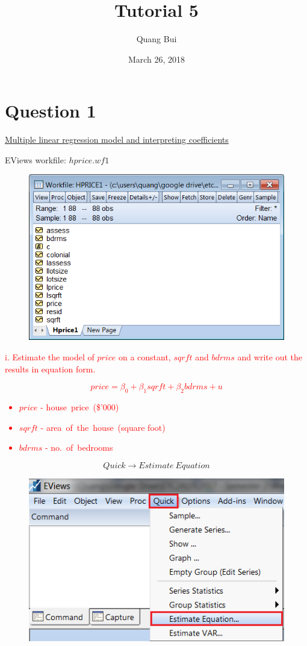 \documentclass[12pt]{report}
\title{Tutorial 5}
\subtitle
{
	\textbf{keywords}: OLS estimator, multiple linear regression, interpretation, ceteris paribus, predict, interpretation, variation, R squared
	
	\textbf{estimated reading time}: 30 minutes
}
\author{Quang Bui}
\date{March 26, 2018}
\begin{document}
	
\maketitle

\newpage
\section*{Question 1}
\underline{Multiple linear regression model and interpreting coefficients}

\noindent EViews workfile: $hprice.wf1$
\begin{figure}[H]
	\centering
	\includegraphics{q5_1}
\end{figure}
\vspace{-\baselineskip}
\noindent \textcolor{red}
{
	i. Estimate the model of $price$ on a constant, $sqrft$ and $bdrms$ and write out the results in equation form.
}
\noindent \textcolor{red}{$$price = \beta_0 + \beta_1sqrft + \beta_2bdrms + u$$ \begin{itemize}
		\item $price$ - house\ price\ (\$'000)
		\item $sqrft$ - area\ of\ the\ house\ (square foot)
		\item $bdrms$ - no.\ of\ bedrooms
\end{itemize}} \vspace{-\baselineskip}
$$Quick \to Estimate\ Equation$$
\begin{figure}[H]
	\centering
	\includegraphics{q1_2}
\end{figure}
\end{document}
